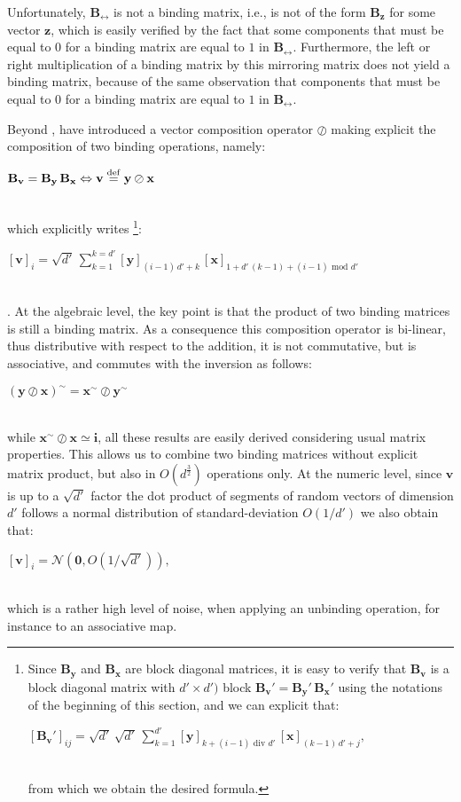 \documentclass[sn-mathphys]{sn-jnl}
\newcommand{\defq}{\stackrel {\rm def}{=}}
\newcommand{\eqline}[1]{~\vspace{0.1cm}\\\centerline{$#1$}\vspace{0.1cm}\\}
\begin{document}
\begin{appendices}
Unfortunately, $\mathbf{B_{\leftrightarrow}}$ is not a binding matrix, i.e., is not of the form $\mathbf{B_z}$ for some vector $\mathbf{z}$, which is easily verified by the fact that some components that must be equal to $0$ for a binding matrix are equal to $1$ in $\mathbf{B_{\leftrightarrow}}$. Furthermore, the left or right multiplication of a binding matrix by this mirroring matrix does not yield a binding matrix, because of the same observation that components that must be equal to $0$ for a binding matrix are equal to $1$ in $\mathbf{B_{\leftrightarrow}}$.

Beyond \cite{gosmann_vector-derived_2019}, \cite{mercier_ontology_2021} have introduced a vector composition operator $\oslash$ making explicit the composition of two binding operations, namely:
\eqline{\mathbf{B_v} = \mathbf{B_y} \, \mathbf{B_x} \Leftrightarrow \mathbf{v} \defq \mathbf{y} \oslash \mathbf{x}}
which explicitly writes \footnote{Since $\mathbf{B_y}$ and $\mathbf{B_x}$ are block diagonal matrices, it is easy to verify that $\mathbf{B_v}$ is a block diagonal matrix with $d' \times d')$ block $\mathbf{B_v}' = \mathbf{B_y}' \, \mathbf{B_x}'$ using the notations of the beginning of this section, and we can explicit that:
\eqline{[\mathbf{B_v}']_{ij} = \sqrt{d'} \, \sqrt{d'} \, \sum_{k = 1}^{d'} [\mathbf{y}]_{k + (i - 1) \mbox{ div } d'} \, [\mathbf{x}]_{(k - 1) \, d' + j},}
from which we obtain the desired formula.}:
\eqline{[\mathbf{v}]_i = \sqrt{d'} \, \sum_{k = 1}^{k = d'} [\mathbf{y}]_{(i - 1) \, d' + k} \, [\mathbf{x}]_{1 + d' \, (k - 1) + (i - 1) \mbox{ mod } d'}}. At the algebraic level, the key point is that the product of two binding matrices is still a binding matrix. As a consequence this composition operator is bi-linear, thus distributive with respect to the addition, it is not commutative, but is associative, and commutes with the inversion as follows:
\eqline{(\mathbf{y} \oslash \mathbf{x})^\sim = \mathbf{x}^\sim \oslash \mathbf{y}^\sim}
while $\mathbf{x}^\sim \oslash \mathbf{x} \simeq \mathbf{\mathbf{i}}$, all these results are easily derived considering usual matrix properties. This allows us to combine two binding matrices without explicit matrix product, but also in $O\left(d^{\frac{3}{2}}\right)$ operations only. At the numeric level, since $\mathbf{v}$ is up to a $\sqrt{d'}$ factor the dot product of segments of random vectors of dimension $d'$ follows a normal distribution of standard-deviation $O(1/d')$ we also obtain that:
\eqline{[\mathbf{v}]_i = {\mathcal N}(\mathbf{0}, O(1/\sqrt{d'})),}
which is a rather high level of noise, when applying an unbinding operation, for instance to an associative map.


\end{appendices}
\end{document}
